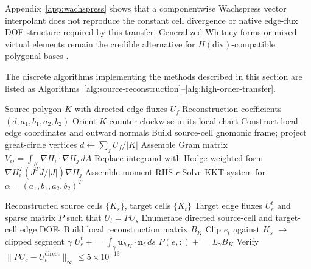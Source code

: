 \documentclass[11pt]{article}
\newcommand{\uh}{\mathbf{u}_h}
\newcommand{\n}{\mathbf{n}}
\begin{document}
Appendix~\ref{app:wachspress} shows that a componentwise Wachspress vector
interpolant does not reproduce the constant cell divergence or native edge-flux
DOF structure required by this transfer.  Generalized Whitney forms or mixed
virtual elements remain the credible alternative for \(H(\mathrm{div})\)-compatible
polygonal bases \cite{GilletteRandBajaj2016}.

The discrete algorithms implementing the methods described in this section are
listed as Algorithms~\ref{alg:source-reconstruction}--\ref{alg:high-order-transfer}.

\begin{algorithm}[t]
\caption{Source-Cell Reconstruction}
\label{alg:source-reconstruction}
\begin{algorithmic}[1]
\REQUIRE Source polygon \(K\) with directed edge fluxes \(U_f\)
\ENSURE  Reconstruction coefficients \((d, a_1, b_1, a_2, b_2)\)
\STATE Orient \(K\) counter-clockwise in its local chart
\STATE Construct local edge coordinates and outward normals
  \STATE Build source-cell gnomonic frame; project great-circle vertices
\ENDIF
\STATE \(d \leftarrow \sum_f U_f / |K|\) \hfill{}
\STATE Assemble Gram matrix \(V_{ij} = \int_K \nabla H_i \cdot \nabla H_j \, dA\) \hfill{}
  \STATE Replace integrand with Hodge-weighted form \(\nabla H_i^T (J^T J / |J|) \nabla H_j\) \hfill{}
\ENDIF
\STATE Assemble moment RHS \(r\) \hfill{}
\STATE Solve KKT system for \(\alpha = (a_1, b_1, a_2, b_2)^T\)
\end{algorithmic}
\end{algorithm}

\begin{algorithm}[t]
\caption{Directed Edge Transfer and Sparse Projection Assembly}
\label{alg:edge-transfer}
\begin{algorithmic}[1]
\REQUIRE Reconstructed source cells \(\{K_s\}\), target cells \(\{K_t\}\)
\ENSURE  Target edge fluxes \(U^t_e\) and sparse matrix \(P\) such that \(U_t = P U_s\)
\STATE Enumerate directed source-cell and target-cell edge DOFs
  \STATE Build local reconstruction matrix \(B_K\) \hfill{}
\ENDFOR
{}
    \STATE Clip \(e_t\) against \(K_s\) \(\to\) clipped segment \(\gamma\)
      \STATE \(U^t_{e} \mathrel{+}= \int_\gamma {\uh}_K \cdot \n_t \, ds\) \hfill{}
      \STATE \(P(e, :) \mathrel{+}= L_\gamma B_K\) \hfill{}
    \ENDIF
  \ENDFOR
\ENDFOR
\STATE Verify \(\|P U_s - U_t^{\mathrm{direct}}\|_\infty \le 5\times10^{-13}\)
\end{algorithmic}
\end{algorithm}
\end{document}
